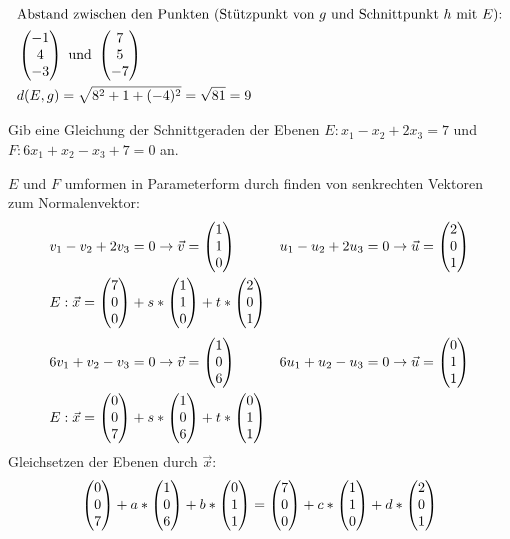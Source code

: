 \begin{lsg}{}
\begin{enumerate}
\begin{align*}
			\intertext{Abstand zwischen den Punkten (Stützpunkt von $g$ und Schnittpunkt $h$ mit $E$):}
			&\begin{pmatrix} -1 \\ 4 \\ -3 \end{pmatrix} \text{ und } \begin{pmatrix} 7\\5\\-7 \end{pmatrix} \\
			&d(E,g)=\sqrt{8^2+1+(-4)^2}=\sqrt{81}=9
		\end{align*}
	\end{enumerate}
\end{lsg}



Gib eine Gleichung der Schnittgeraden der Ebenen $E: x_1-x_2+2x_3=7$ und $F:6x_1+x_2-x_3+7=0$ an.
\begin{lsg}{}
	$E$ und $F$ umformen in Parameterform durch finden von senkrechten Vektoren zum Normalenvektor:
	\begin{align*}
		&v_1-v_2+2v_3=0 \rightarrow\vec v=\begin{pmatrix} 1\\1\\0 \end{pmatrix}
		&u_1-u_2+2u_3=0 \rightarrow\vec u=\begin{pmatrix} 2\\0\\1 \end{pmatrix}\\
		&E: \vec x=\begin{pmatrix} 7\\0\\0 \end{pmatrix}+s*\begin{pmatrix} 1\\1\\0 \end{pmatrix}+t*\begin{pmatrix} 2\\0\\1 \end{pmatrix}
	\end{align*}
	\begin{align*}
		&6v_1+v_2-v_3=0 \rightarrow\vec v=\begin{pmatrix} 1\\0\\6 \end{pmatrix}
		&6u_1+u_2-u_3=0 \rightarrow\vec u=\begin{pmatrix} 0\\1\\1 \end{pmatrix}\\
		&E: \vec x=\begin{pmatrix} 0\\0\\7 \end{pmatrix}+s*\begin{pmatrix} 1\\0\\6 \end{pmatrix}+t*\begin{pmatrix} 0\\1\\1 \end{pmatrix}
	\end{align*}
	Gleichsetzen der Ebenen durch $\vec x$:
	\begin{align*}
		\vektor{0\\0\\7}+a*\vektor{1\\0\\6}+b*\vektor{0\\1\\1}=\vektor{7\\0\\0}+c*\vektor{1\\1\\0}+d*\vektor{2\\0\\1}\\

\end{align*}
\end{lsg}
